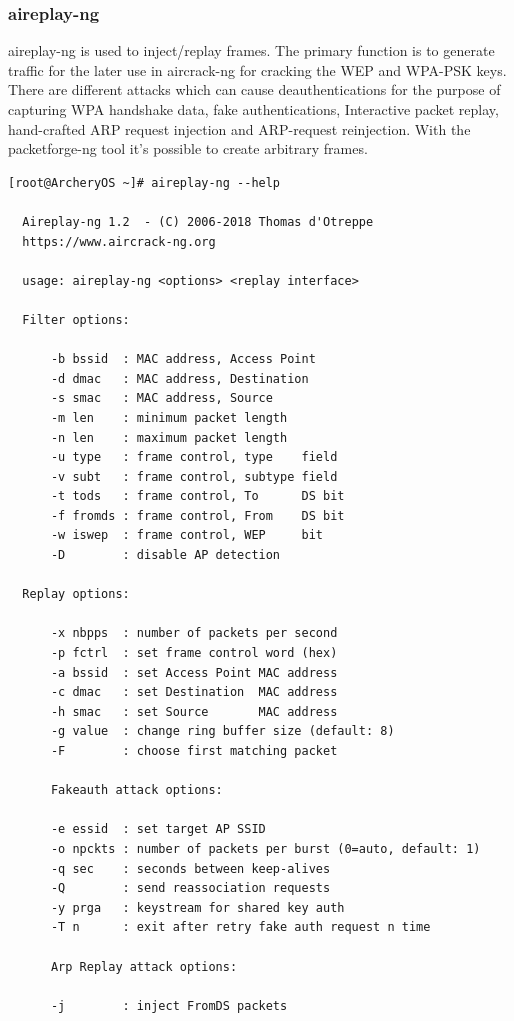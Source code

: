 \documentclass{article}
\begin{document}
\subsubsection{aireplay-ng}
aireplay-ng  is  used to inject/replay frames.  The primary function is to generate traffic for the later use in aircrack-ng for cracking the WEP and WPA-PSK  keys.  There  are different attacks which can cause deauthentications for the purpose of capturing WPA handshake  data,  fake  authentications,  Interactive  packet replay, hand-crafted ARP request injection and ARP-request reinjection. With the packetforge-ng  tool  it's  possible  to create arbitrary frames.
\begin{lstlisting}
[root@ArcheryOS ~]# aireplay-ng --help

  Aireplay-ng 1.2  - (C) 2006-2018 Thomas d'Otreppe
  https://www.aircrack-ng.org

  usage: aireplay-ng <options> <replay interface>

  Filter options:

      -b bssid  : MAC address, Access Point
      -d dmac   : MAC address, Destination
      -s smac   : MAC address, Source
      -m len    : minimum packet length
      -n len    : maximum packet length
      -u type   : frame control, type    field
      -v subt   : frame control, subtype field
      -t tods   : frame control, To      DS bit
      -f fromds : frame control, From    DS bit
      -w iswep  : frame control, WEP     bit
      -D        : disable AP detection

  Replay options:

      -x nbpps  : number of packets per second
      -p fctrl  : set frame control word (hex)
      -a bssid  : set Access Point MAC address
      -c dmac   : set Destination  MAC address
      -h smac   : set Source       MAC address
      -g value  : change ring buffer size (default: 8)
      -F        : choose first matching packet

      Fakeauth attack options:

      -e essid  : set target AP SSID
      -o npckts : number of packets per burst (0=auto, default: 1)
      -q sec    : seconds between keep-alives
      -Q        : send reassociation requests
      -y prga   : keystream for shared key auth
      -T n      : exit after retry fake auth request n time

      Arp Replay attack options:

      -j        : inject FromDS packets


\end{lstlisting}
\end{document}
